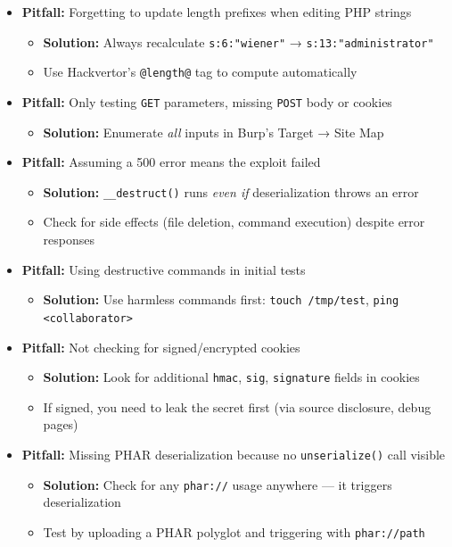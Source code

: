 \documentclass[11pt]{article}
\begin{document}
\begin{itemize}
    \item \textbf{Pitfall:} Forgetting to update length prefixes when editing PHP strings
    \begin{itemize}
        \item \textbf{Solution:} Always recalculate \texttt{s:6:"wiener"} → \texttt{s:13:"administrator"}
        \item Use Hackvertor's \verb|@length@| tag to compute automatically
    \end{itemize}
    
    \item \textbf{Pitfall:} Only testing \texttt{GET} parameters, missing \texttt{POST} body or cookies
    \begin{itemize}
        \item \textbf{Solution:} Enumerate \textit{all} inputs in Burp's Target → Site Map
    \end{itemize}
    
    \item \textbf{Pitfall:} Assuming a 500 error means the exploit failed
    \begin{itemize}
        \item \textbf{Solution:} \texttt{\_\_destruct()} runs \textit{even if} deserialization throws an error
        \item Check for side effects (file deletion, command execution) despite error responses
    \end{itemize}
    
    \item \textbf{Pitfall:} Using destructive commands in initial tests
    \begin{itemize}
        \item \textbf{Solution:} Use harmless commands first: \texttt{touch /tmp/test}, \texttt{ping <collaborator>}
    \end{itemize}
    
    \item \textbf{Pitfall:} Not checking for signed/encrypted cookies
    \begin{itemize}
        \item \textbf{Solution:} Look for additional \texttt{hmac}, \texttt{sig}, \texttt{signature} fields in cookies
        \item If signed, you need to leak the secret first (via source disclosure, debug pages)
    \end{itemize}
    
    \item \textbf{Pitfall:} Missing PHAR deserialization because no \texttt{unserialize()} call visible
    \begin{itemize}
        \item \textbf{Solution:} Check for any \texttt{phar://} usage anywhere — it triggers deserialization
        \item Test by uploading a PHAR polyglot and triggering with \texttt{phar://path}
    \end{itemize}
\end{itemize}
\end{document}
